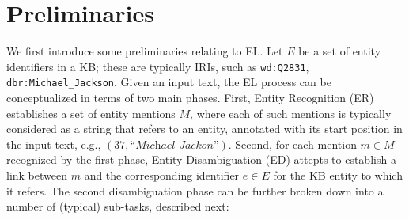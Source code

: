 \documentclass{llncs}
\begin{document}


\section{Preliminaries}
\label{subsect:preliminaries}

We first introduce some preliminaries relating to EL. Let $E$ be a set of entity identifiers in a KB; these are typically IRIs, such as \texttt{wd:Q2831}, \texttt{dbr:Michael\_Jackson}. Given an input text, the EL process can be conceptualized in terms of two main phases. First, Entity Recognition (ER) establishes a set of entity mentions $M$, where each of such mentions is typically considered as a string that refers to an entity, annotated with its start position in the input text, e.g., $(37,\textit{``Michael Jackon''})$. Second, for each mention $m\in{}M$ recognized by the first phase, Entity Disambiguation (ED) attepts to establish a link between $m$ and the corresponding identifier $e\in{}E$ for the KB entity to which it refers. The second disambiguation phase can be further broken down into a number of (typical) sub-tasks, described next:
\end{document}
